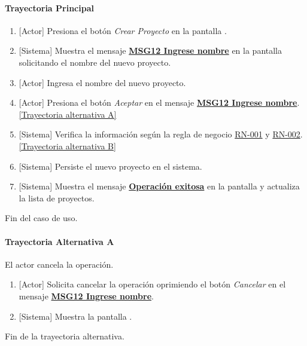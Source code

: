 \paragraph{Trayectoria Principal}
\label{CUW_Crear_Proyecto}
	\begin{enumerate}
	    \item {[Actor]} Presiona el botón \textit{Crear Proyecto} en la pantalla \textbf{}.
	    
	    \item {[Sistema]} Muestra el mensaje \hyperref[MSG12]{\bf MSG12 Ingrese nombre} en la pantalla \textbf{} solicitando el nombre del nuevo proyecto.
	    
	    \item {[Actor]} Ingresa el nombre del nuevo proyecto.
	    
	    \item {[Actor]} Presiona el botón \textit{Aceptar} en el mensaje \hyperref[MSG12]{ \bf MSG12 Ingrese nombre}. \hyperref[W-PR-CU1.2:TA]{[Trayectoria alternativa A]}
	    
	    \item {[Sistema]} Verifica la información según la regla de negocio \hyperref[RN001]{RN-001} y \hyperref[RN002]{RN-002}.\hyperref[W-PR-CU1.2:TB]{[Trayectoria alternativa B]}
	    
	    \item {[Sistema]} Persiste el nuevo proyecto en el sistema.
	    
	    \item {[Sistema]} Muestra el mensaje \hyperref[MSG9]{\bf Operación exitosa} en la pantalla \textbf{} y actualiza la lista de proyectos.

	\end{enumerate}
	Fin del caso de uso.
	
\paragraph{Trayectoria Alternativa A} \label{W-PR-CU1.2:TA}
	El actor cancela la operación.
	\begin{enumerate}[label=A\arabic*.]
		\item {[Actor]} Solicita cancelar la operación oprimiendo el botón \textit{Cancelar} en el mensaje \hyperref[MSG12]{\bf MSG12 Ingrese nombre}.
		\item {[Sistema]} Muestra la pantalla \textbf{}.
	\end{enumerate}
	Fin de la trayectoria alternativa.

